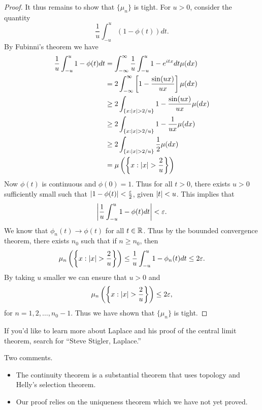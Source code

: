 \begin{proof}
    It thus remains to show that $\{\mu_n\}$ is tight. For $u >0$, consider the quantity
    \[\frac{1}{u}\int_{-u}^u (1-\phi(t))dt. \]
    By Fubinni's theorem we have
    \begin{align*}
        \frac{1}{u}\int_{-u}^u 1 -\phi(t)dt &= \int_{-\infty}^\infty \frac{1}{u}\int_{-u}^u 1-e^{itx}dt \mu(dx)\\
        &= 2 \int_{-\infty}^\infty \left[1-\frac{\sin(ux)}{ux}\right]\mu(dx)\\
        &\ge 2\int_{\{x:{\left\lvert x\right\rvert}>2/u\}} 1-\frac{\sin(ux)}{ux}\mu(dx)\\
        &\ge 2\int_{\{x:{\left\lvert x\right\rvert}>2/u\}} 1-\frac{1}{ux}\mu(dx)\\
        &\ge 2\int_{\{x:{\left\lvert x\right\rvert}>2/u\}} \frac{1}{2}\mu(dx)\\
        &=\mu\left(\left\{x:{\left\lvert x\right\rvert} > \frac{2}{u}\right\}\right)
    \end{align*}
    Now $\phi(t)$ is continuous and $\phi(0)=1$. Thus for all $t>0$, there exists $u>0$ sufficiently small such that ${\left\lvert1-\phi(t)\right\rvert}< \frac{\varepsilon}{2}$, given ${\left\lvert t\right\rvert} <u$. This implies that 
    \[{\left\lvert\frac{1}{u}\int_{-u}^u 1-\phi(t)dt\right\rvert} < \varepsilon. \]
    We know that $\phi_n(t) \to \phi(t)$ for all $t \in {\mathbb R}$. Thus by the bouunded convergence theorem, there exists $n_0$ such that if $n \ge n_0$, then 
    \[\mu_n\left(\left\{x:{\left\lvert x\right\rvert}> \frac{2}{u}\right\}\right) \le \frac{1}{u}\int_{-u}^u 1-\phi_n(t)dt \le 2 \varepsilon. \]
    By taking $u$ smaller we can ensure that $u>0$ and 
    \[\mu_n\left(\left\{x:{\left\lvert x\right\rvert}> \frac{2}{u}\right\}\right) \le 2\varepsilon, \]
    for $n=1,2,\ldots,n_0-1$. Thus we have shown that $\{\mu_n\}$ is tight. 
\end{proof}
If you'd like to learn more about Laplace and his proof of the central limit theorem, search for ``Steve Stigler, Laplace.''
\begin{remark}
    Two comments.
    \begin{itemize}
        \item The continuity theorem is a substantial theorem that uses topology and Helly's selection theorem.
        \item Our proof relies on the uniqueness theorem which we have not yet proved.
    \end{itemize}
\end{remark}

